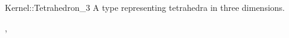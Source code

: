 \begin{ccRefConcept}{Kernel::Tetrahedron_3}
A type representing tetrahedra in three dimensions.

\ccRefines
{},

\ccSeeAlso
{}

\end{ccRefConcept}
